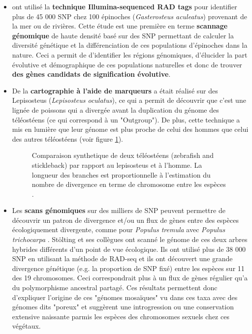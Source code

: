 \documentclass[a4paper,11pt,twoside]{report}
\begin{document}
\begin{itemize}
\item \citep{hohenlohe2010population} ont utilisé la \textbf{technique Illumina-sequenced RAD tags} pour identifier plus de 45 000 SNP chez 100 épinoches (\textit{Gasterosteus aculeatus}) provenant de la mer ou de rivières. Cette étude est une première en terme \textbf{scannage génomique} de haute densité basé sur des SNP permettant de calculer la diversité génétique et la différenciation de ces populations d'épinoches dans la nature. Ceci a permit de d'identifier les régions génomiques, d'élucider la part évolutive et démographique de ces populations naturelles et donc de trouver \textbf{des gènes candidats de signification évolutive}. 

\item De la \textbf{cartographie à l'aide de marqueurs} a était réalisé sur des Lepisosteus (\textit{Lepisosteus oculatus})\citep{Amores2011aa}, ce qui a permit de découvrir que c'est une lignée de poissons qui a divergée avant la duplication du génome des téléostéens (ce qui correspond à un "Outgroup"). De plus, cette technique a mis en lumière que leur génome est plus proche de celui des hommes que celui des autres téléostéens (voir figure \ref{2}).

\begin{figure}[!ht]
\caption{Comparaison synthetique de deux téléostéens (zebrafish and stickleback) par rapport au lepisosteus et à l'homme. La longueur des branches est proportionnelle à l'estimation du nombre de divergence en terme de chromosome entre les espèces \citep{Amores2011aa}\label{2}.}
\end{figure}


\item Les \textbf{scans génomiques} sur des milliers de SNP peuvent permettre de découvrir un patron de divergence et/ou un flux de gènes entre des espèces écologiquement divergente, comme pour \textit{Populus tremula} avec \textit{Populus trichocarpa} \citep{Stolting2013aa}. Stölting et ses collègues ont scanné le génome de ces deux arbres hybrides différents d'un point de vue écologique. Ils ont utilisé plus de 38 000 SNP en utilisant la méthode de RAD-seq et ils ont découvert une grande divergence génétique (e.g. la proportion de SNP fixé) entre les espèces sur 11 des 19 chromosomes. Ceci correspondrait plus à un flux de gènes régulier qu'a du polymorphisme ancestral partagé. Ces résultats permettent donc d'expliquer l'origine de ces "génomes mosaïques" \citep{Stolting2013aa} vu dans ces taxa avec des génomes dits "poreux" \citep{Stolting2013aa} et suggèrent une introgression ou une conservation extensive naissante parmis les espèces des chromosomes sexuels chez ces végétaux. 


\end{itemize}
\end{document}
